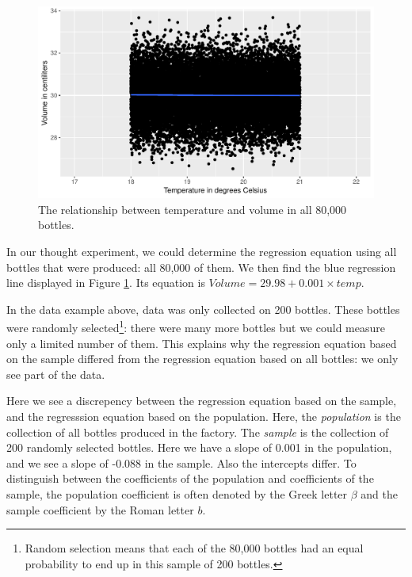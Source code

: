 \documentclass[]{book}\usepackage[]{graphicx}\usepackage[]{color}
\makeatletter
\def\maxwidth{ %
  \ifdim\Gin@nat@width>\linewidth
    \linewidth
  \else
    \Gin@nat@width
  \fi
}
\newenvironment{knitrout}{}{} %
\makeatother
\begin{document}
\begin{knitrout}
\color{fgcolor}\begin{figure}

{\centering \includegraphics[width=\maxwidth]{figure/inf_1-1} 

}

\caption[The relationship between temperature and volume in all 80,000 bottles]{The relationship between temperature and volume in all 80,000 bottles.}\label{fig:inf_1}
\end{figure}


\end{knitrout}


In our thought experiment, we could determine the regression equation using all bottles that were produced: all 80,000 of them. We then find the blue regression line displayed in Figure \ref{fig:inf_1}. Its equation is $Volume = 29.98 + 0.001 \times temp$.


In the data example above, data was only collected on 200 bottles. These bottles were randomly selected\footnote{Random selection means that each of the 80,000 bottles had an equal probability to end up in this sample of 200 bottles.}: there were many more bottles but we could measure only a limited number of them. This explains why the regression equation based on the sample differed from the regression equation based on all bottles: we only see part of the data.

Here we see a discrepency between the regression equation based on the sample, and the regresssion equation based on the population. Here, the \textit{population} is the collection of all bottles produced in the factory. The \textit{sample} is the collection of 200 randomly selected bottles. Here we have a slope of 0.001 in the population, and we see a slope of -0.088 in the sample. Also the intercepts differ. To distinguish between the coefficients of the population and coefficients of the sample, the population coefficient is often denoted by the Greek letter $\beta$ and the sample coefficient by the Roman letter $b$.
\end{document}
